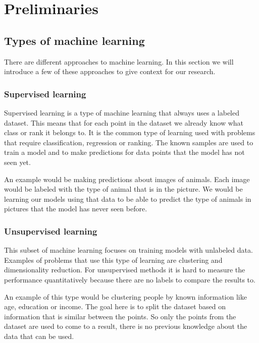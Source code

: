 \chapter{Preliminaries}\label{ch:preliminaries}

\section{Types of machine learning}
\label{sec:prelim:types-of-machine-learning}

There are different approaches to machine learning. In this section we will introduce a few of these approaches to give context for our research.


\subsection{Supervised learning}

Supervised learning \cite{mohri_foundations_2012} is a type of machine learning that always uses a labeled dataset. This means that for each point in the dataset we already know what class or rank it belongs to. It is the common type of learning used with problems that require classification, regression or ranking. The known samples are used to train a model and to make predictions for data points that the model has not seen yet.

An example would be making predictions about images of animals. Each image would be labeled with the type of animal that is in the picture. We would be learning our models using that data to be able to predict the type of animals in pictures that the model has never seen before.

\subsection{Unsupervised learning}

This subset of machine learning focuses on training models with unlabeled data. Examples of problems that use this type of learning are clustering and dimensionality reduction. For unsupervised methods it is hard to measure the performance quantitatively because there are no labels to compare the results to.

An example of this type would be clustering people by known information like age, education or income. The goal here is to split the dataset based on information that is similar between the points. So only the points from the dataset are used to come to a result, there is no previous knowledge about the data that can be used.

